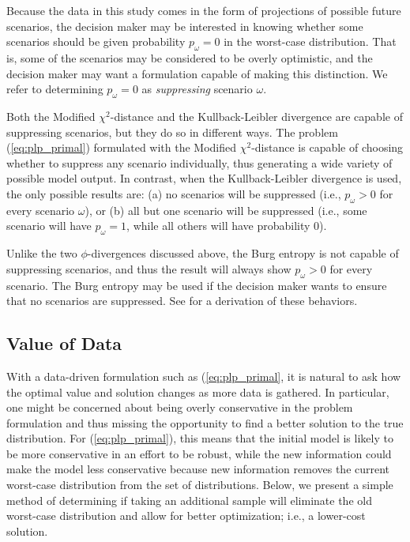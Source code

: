 \documentclass[opre,nonblindrev]{informs3} %
\begin{document}
Because the data in this study comes in the form of projections of possible future scenarios, the decision maker may be interested in knowing whether some scenarios should be given probability $p_\omega = 0$ in the worst-case distribution.
That is, some of the scenarios may be considered to be overly optimistic, and the decision maker may want a formulation capable of making this distinction.
We refer to determining $p_\omega = 0$ as \emph{suppressing} scenario $\omega$.

Both the Modified $\chi^2$-distance and the Kullback-Leibler divergence are capable of suppressing scenarios, but they do so in different ways.
The problem (\ref{eq:plp_primal}) formulated with the Modified $\chi^2$-distance is capable of choosing whether to suppress any scenario individually, thus generating a wide variety of possible model output.
In contrast, when the Kullback-Leibler divergence is used, the only possible results are: (a) no scenarios will be suppressed (i.e., $p_\omega > 0$ for every scenario $\omega$), or (b) all but one scenario will be suppressed (i.e., some scenario will have $p_\omega = 1$, while all others will have probability 0).

Unlike the two $\phi$-divergences discussed above, the Burg entropy is not capable of suppressing scenarios, and thus the result will always show $p_\omega > 0$ for every scenario.
The Burg entropy may be used if the decision maker wants to ensure that no scenarios are suppressed.
See \citep{love2013phi} for a derivation of these behaviors.


\subsection{Value of Data}
\label{ssec:value}

With a data-driven formulation such as (\ref{eq:plp_primal}, it is natural to ask how the optimal value and solution changes as more data is gathered.
In particular, one might be concerned about being overly conservative in the problem formulation and thus missing the opportunity to find a better solution to the true distribution.
For (\ref{eq:plp_primal}), this means that the initial model is likely to be more conservative in an effort to be robust, while the new information could make the model less conservative because new information removes the current worst-case distribution from the set of distributions.  
Below, we present a simple method of determining if taking an additional sample will eliminate the old worst-case distribution and allow for better optimization; i.e., a lower-cost solution.
\end{document}
